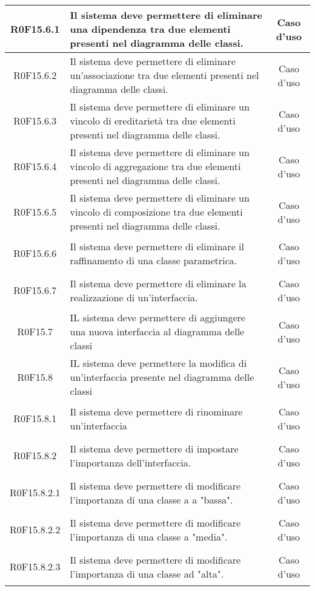 \documentclass[../AnalisiDeiRequisiti.tex]{subfiles}
\begin{document}
\begin{longtable}{|c|>{\centering}p{7cm}|c|}
	\hypertarget{R0F15.6.1}{R0F15.6.1} & Il sistema deve permettere di eliminare una dipendenza tra due elementi presenti nel diagramma delle classi. & Caso d'uso \\ \hline
	\hypertarget{R0F15.6.2}{R0F15.6.2} & Il sistema deve permettere di eliminare un'associazione tra due elementi presenti nel diagramma delle classi. & Caso d'uso \\ \hline
	\hypertarget{R0F15.6.3}{R0F15.6.3} & Il sistema deve permettere di eliminare un vincolo di ereditarietà tra due elementi presenti nel diagramma delle classi. & Caso d'uso \\ \hline
	\hypertarget{R0F15.6.4}{R0F15.6.4} & Il sistema deve permettere di eliminare un vincolo di aggregazione tra due elementi presenti nel diagramma delle classi. & Caso d'uso \\ \hline
	\hypertarget{R0F15.6.5}{R0F15.6.5} & Il sistema deve permettere di eliminare un vincolo di composizione tra due elementi presenti nel diagramma delle classi. & Caso d'uso \\ \hline
	\hypertarget{R0F15.6.6}{R0F15.6.6} & Il sistema deve permettere di eliminare il raffinamento di una classe parametrica.  & Caso d'uso \\ \hline
	\hypertarget{R0F15.6.7}{R0F15.6.7} & Il sistema deve permettere di eliminare la realizzazione di un'interfaccia. & Caso d'uso \\ \hline
	\hypertarget{R0F15.7}{R0F15.7} & IL sistema deve permettere di aggiungere una nuova interfaccia al diagramma delle classi & Caso d'uso \\ \hline
	\hypertarget{R0F15.8}{R0F15.8} & IL sistema deve permettere la modifica di un'interfaccia presente nel diagramma delle classi & Caso d'uso \\ \hline
	\hypertarget{R0F15.8.1}{R0F15.8.1} & Il sistema deve permettere di rinominare un'interfaccia & Caso d'uso \\ \hline
	\hypertarget{R0F15.8.2}{R0F15.8.2} & Il sistema deve permettere di impostare l'importanza dell'interfaccia. & Caso d'uso \\ \hline
	\hypertarget{R0F15.8.2.1}{R0F15.8.2.1} & Il sistema deve permettere di modificare l'importanza di una classe a a "bassa". & Caso d'uso \\ \hline
	\hypertarget{R0F15.8.2.2}{R0F15.8.2.2} & Il sistema deve permettere di modificare l'importanza di una classe a "media". & Caso d'uso \\ \hline
	\hypertarget{R0F15.8.2.3}{R0F15.8.2.3} & Il sistema deve permettere di modificare l'importanza di una classe ad "alta". & Caso d'uso \\ \hline

\end{longtable}
\end{document}
